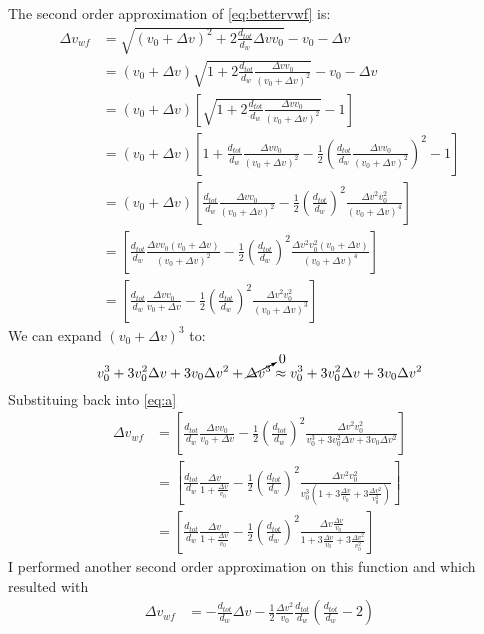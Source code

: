 \documentclass[12pt,letterpaper]{letter}
\newcommand{\dv}{\Delta v}
\begin{document}
The second order approximation of \eqref{eq:bettervwf} is:
\begin{align}
   \dv_{wf} &= \sqrt{\left( v_0 +\dv\right)^2+2\frac{d_{tot}}{d_w} \dv v_0 }-v_0 -\dv \\
   &= \left( v_0 +\dv\right)\sqrt{1+2\frac{d_{tot}}{d_w} \frac{\dv v_0}{\left( v_0 +\dv\right)^2} }-v_0 -\dv\\
   &= \left( v_0 +\dv\right)\left[ \sqrt{1+2\frac{d_{tot}}{d_w} \frac{\dv v_0}{\left( v_0 +\dv\right)^2} }-1 \right]\\
   &= \left( v_0 + \dv \right) \left[ 1+\frac{d_{tot}}{d_w}\frac{\dv v_0}{(v_0 +\dv)^2} -\frac{1}{2}\left( \frac{d_{tot}}{d_w}\frac{\dv v_0}{(v_0 + \dv)^2} \right)^2 -1 \right]\\
   &= \left( v_0 + \dv \right) \left[ \frac{d_{tot}}{d_w}\frac{\dv v_0}{(v_0 +\dv)^2} -\frac{1}{2}\left( \frac{d_{tot}}{d_w}\right)^2\frac{\dv^2 v_0^2}{(v_0 + \dv)^4} \right]\\
   &= \left[ \frac{d_{tot}}{d_w}\frac{\dv v_0\left( v_0 + \dv \right) }{(v_0 +\dv)^2} -\frac{1}{2}\left( \frac{d_{tot}}{d_w}\right)^2\frac{\dv^2 v_0^2\left( v_0 + \dv \right) }{(v_0 + \dv)^4} \right]\\
   &= \left[ \frac{d_{tot}}{d_w}\frac{\dv v_0 }{v_0 +\dv} -\frac{1}{2}\left( \frac{d_{tot}}{d_w}\right)^2\frac{\dv^2 v_0^2\ }{(v_0 + \dv)^3} \right]
   \label{eq:a}
\end{align}
We can expand $(v_0 + \dv)^3$ to:
\begin{equation}
   v_0^3+3v_0^2 \dv +3v_0\dv^2+\cancelto{0}{\dv^3} \approx v_0^3+3v_0^2 \dv +3v_0\dv^2
\end{equation}
Substituing back into \eqref{eq:a}
\begin{align}
   \label{eq:b}
   \dv_{wf} &= \left[ \frac{d_{tot}}{d_w}\frac{\dv v_0 }{v_0 +\dv} -\frac{1}{2}\left( \frac{d_{tot}}{d_w}\right)^2\frac{\dv^2 v_0^2\ }{v_0^3+3v_0^2 \dv +3v_0\dv^2} \right]\\
   &= \left[ \frac{d_{tot}}{d_w}\frac{\dv}{1+\frac{\dv}{v_0}} -\frac{1}{2}\left( \frac{d_{tot}}{d_w}\right)^2\frac{\dv^2 v_0^2\ }{v_0^3\left(1+3\frac{ \dv}{v_0} +3\frac{\dv^2}{v_0^2}\right)} \right]\\
   &= \left[ \frac{d_{tot}}{d_w}\frac{\dv}{1+\frac{\dv}{v_0}} -\frac{1}{2}\left( \frac{d_{tot}}{d_w}\right)^2\frac{\dv \frac{\dv} {v_0}\ }{1+3\frac{ \dv}{v_0} +3\frac{\dv^2}{v_0^2}} \right]
\end{align}
I performed another second order approximation on this function and which resulted with
\begin{align}
   \dv_{wf} &= - \frac{d_{tot}}{d_w}\dv - \frac{1}{2} \frac{\dv^2}{v_0}\frac{d_{tot}}{d_w}\left( \frac{d_{tot}}{d_w}-2 \right)
\end{align}
\end{document}
